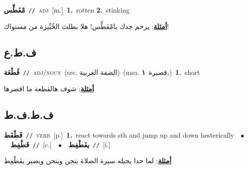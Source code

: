 \documentclass[10pt,a4paper,twoside]{article} %
\begin{document}
\begin{multicols}{2}
{\setlength\topsep{0pt}\textbf{\foreignlanguage{arabic}{مْفَطِّس}}\ {\color{gray}\texttt{//}\color{black}}\ \textsc{adj}\ [m.]\ \textbf{1.}~rotten  \textbf{2.}~stinking\  \begin{flushright}\color{gray}\foreignlanguage{arabic}{\textbf{\underline{\foreignlanguage{arabic}{أمثلة}}}: يرحم جدك يامْفَطِّس! هلا بطلت الخُبِّيزة من مستواك!}\end{flushright}\color{black}} \vspace{2mm}

\vspace{-3mm}
\subsection*{\color{blue}\foreignlanguage{arabic}{ف.ط.ع}\color{blue}{}} 

{\setlength\topsep{0pt}\textbf{\foreignlanguage{arabic}{فُطْعَة}}\ {\color{gray}\texttt{//}\color{black}}\ \textsc{adj/noun}\ (src. \color{gray}\foreignlanguage{arabic}{الضفة الغربية}\color{black})\ \color{gray}(msa. \foreignlanguage{arabic}{قصيرة}~\foreignlanguage{arabic}{\textbf{١.}})\color{black}\ \textbf{1.}~short\  \begin{flushright}\color{gray}\foreignlanguage{arabic}{\textbf{\underline{\foreignlanguage{arabic}{أمثلة}}}: شوف هالفطعة ما اقصرها}\end{flushright}\color{black}} \vspace{2mm}

\vspace{-3mm}
\subsection*{\color{blue}\foreignlanguage{arabic}{ف.ط.ف.ط}\color{blue}{}} 

{\setlength\topsep{0pt}\textbf{\foreignlanguage{arabic}{فَطْفَط}}\ {\color{gray}\texttt{//}\color{black}}\ \textsc{verb}\ [p.]\ \textbf{1.}~react towards sth and jump up and down hesterically\ \ $\bullet$\ \ \setlength\topsep{0pt}\textbf{\foreignlanguage{arabic}{فَطْفِط}}\ {\color{gray}\texttt{//}\color{black}}\ [c.]\ \ $\bullet$\ \ \setlength\topsep{0pt}\textbf{\foreignlanguage{arabic}{يفَطْفِط}}\ {\color{gray}\texttt{//}\color{black}}\ [i.]\  \begin{flushright}\color{gray}\foreignlanguage{arabic}{\textbf{\underline{\foreignlanguage{arabic}{أمثلة}}}: لما حدا يجيله سيرة الصلاة بنجن وبنحن وبصير يفَطْفِط}\end{flushright}\color{black}} \vspace{2mm}


\end{multicols}
\end{document}

